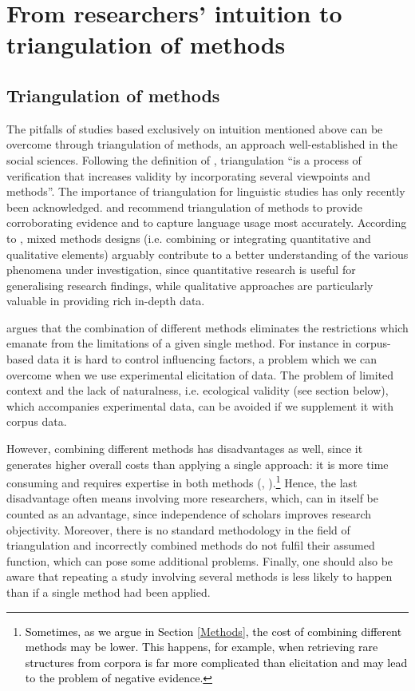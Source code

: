 \section{From researchers' intuition to triangulation of methods}
\label{From researchers' intuition to triangulation of methods}
\subsection{Triangulation of methods}
\label{Triangulation of methods}
The pitfalls of studies based exclusively on intuition mentioned above can be overcome through triangulation of methods, an approach well-established in the social sciences.  Following the definition of \citet[154]{YeasminRahman12}, triangulation ``is a process of verification that increases validity by incorporating several viewpoints and methods''. The importance of triangulation for linguistic studies has only recently been acknowledged. \citet[100]{Hoffmann13} and \citet[311]{FordBresnan13} recommend triangulation of methods to provide corroborating evidence and to capture language usage most accurately. According to \citet[33]{Angouri10}, mixed methods designs (i.e. combining or integrating quantitative and qualitative elements) arguably contribute to a better understanding of the various phenomena under investigation, since quantitative research is useful for generalising research findings, while qualitative approaches are particularly valuable in providing rich in-depth data.

\begin{sloppypar}
\citet[293]{Rosenbach13} argues that the combination of different methods eliminates the restrictions which emanate from the limitations of a given single  method. For instance in corpus-based data it is hard to control influencing factors, a problem which we can overcome when we use experimental elicitation of data. The problem of limited context and the lack of naturalness, i.e. ecological validity (see section below), which accompanies experimental data, can be avoided if we supplement it with corpus data. 
\end{sloppypar}

However, combining different methods has disadvantages as well, since it generates higher overall costs than applying a single approach: it is more time consuming and requires expertise in both methods (\citealt[293]{Rosenbach13}, \citealt[311]{FordBresnan13}).\footnote{\textcolor{black}{Sometimes, as we argue in Section \ref{Methods},  the cost of combining different methods may be lower. This happens, for example, when retrieving rare structures from corpora is far more complicated than elicitation and may lead to the problem of negative evidence.}} Hence, the last disadvantage often means involving more researchers, which, can in itself be counted as an advantage, since independence of scholars improves research objectivity. Moreover, there is no standard methodology in the field of triangulation and incorrectly combined methods do not fulfil their assumed function, which can pose some additional problems. Finally, one should also be aware that repeating a study involving several methods is less likely to happen than if a single method had been applied.


